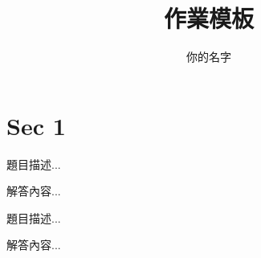 \documentclass[a4paper]{report}
\author{你的名字}
\title{作業模板}
\begin{document}
\maketitle

\newpage

\section{Sec 1}

\begin{problem}
題目描述...
\end{problem}
\begin{answer}
解答內容...
\end{answer}

\begin{problem}
題目描述...
\end{problem}
\begin{answer}
解答內容...
\end{answer}


\newpage
\pagestyle{plain}
\printbibliography{}
\end{document}
